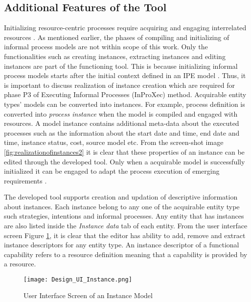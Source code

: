 \subsection{Additional Features of the Tool}
Initializing resource-centric processes require acquiring and engaging interrelated resources \cite{Sungur2015}. As mentioned earlier, the phases of compiling and initializing of informal process models are not within scope of this work. Only the functionalities such as creating instances, extracting instances and editing instances are part of the functioning tool. This is because initializing informal process models starts after the initial context defined in an IPE model \cite{Sungur2015}. Thus, it is important to discuss realization of instance creation which are required for phase P3 of Executing Informal Processes (InProXec) method. Acquirable entity types' models can be converted into instances. For example, process definition is converted into \textit{process instance} when the model is compiled and engaged with resources. A model instance contains additional meta-data about the executed processes such as the information about the start date and time, end date and time, instance status, cost, source model etc. From the screen-shot image \ref{fig:realizationofinstances2} it is clear that these properties of an instance can be edited through the developed tool. Only when a acquirable model is successfully initialized it can be engaged to adapt the process execution of emerging requirements \cite{Sungur2015}. 

The developed tool supports creation and updation of descriptive information about instances. Each instance belong to any one of the acquirable entity type such strategies, intentions and informal processes. Any entity that has instances are also listed inside the \textit{Instance data} tab of each entity. From the user interface screen Figure \ref{fig:realizationofinstances}, it is clear that the editor has ability to add, remove and extract instance descriptors for any entity type. An instance descriptor of a functional capability refers to a resource definition meaning that a capability is provided by a resource.
 
\begin{figure} [H]
	\centering
	\texttt{[image: Design\_UI\_Instance.png]}
	\caption{User Interface Screen of an Instance Model}
	\label{fig:realizationofinstances}
\end{figure}


